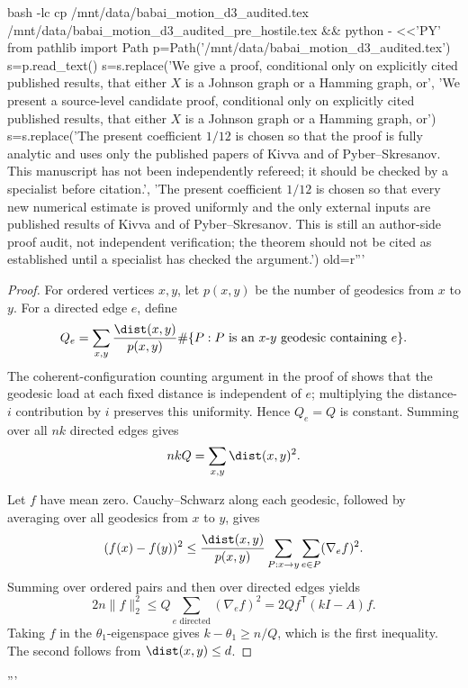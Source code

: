 bash -lc cp /mnt/data/babai_motion_d3_audited.tex /mnt/data/babai_motion_d3_audited_pre_hostile.tex && python - <<'PY'
from pathlib import Path
p=Path('/mnt/data/babai_motion_d3_audited.tex')
s=p.read_text()
s=s.replace('We give a proof, conditional only on explicitly cited published results, that either $X$ is a Johnson graph or a Hamming graph, or',
            'We present a source-level candidate proof, conditional only on explicitly cited published results, that either $X$ is a Johnson graph or a Hamming graph, or')
s=s.replace('The present coefficient $1/12$ is chosen so that the proof is fully analytic and uses only the published papers of Kivva and of Pyber--Skresanov.  This manuscript has not been independently refereed; it should be checked by a specialist before citation.',
            'The present coefficient $1/12$ is chosen so that every new numerical estimate is proved uniformly and the only external inputs are published results of Kivva and of Pyber--Skresanov.  This is still an author-side proof audit, not independent verification; the theorem should not be cited as established until a specialist has checked the argument.')
old=r'''\begin{proof}
For ordered vertices $x,y$, let $p(x,y)$ be the number of geodesics from $x$ to $y$.  For a directed edge $e$, define
\[
 Q_e=\sum_{x,y}\frac{\dist(x,y)}{p(x,y)}
 \#\{P:P\text{ is an }x\text{-}y\text{ geodesic containing }e\}.
\]
The coherent-configuration counting argument in the proof of \cite[Proposition 2.8]{PS} shows that the geodesic load at each fixed distance is independent of $e$; multiplying the distance-$i$ contribution by $i$ preserves this uniformity.  Hence $Q_e=Q$ is constant.  Summing over all $nk$ directed edges gives
\[
 nkQ=\sum_{x,y}\dist(x,y)^2.
\]

Let $f$ have mean zero.  Cauchy--Schwarz along each geodesic, followed by averaging over all geodesics from $x$ to $y$, gives
\[
 (f(x)-f(y))^2\le
 \frac{\dist(x,y)}{p(x,y)}
 \sum_{P:x\to y}\sum_{e\in P}(\nabla_e f)^2.
\]
Summing over ordered pairs and then over directed edges yields
\[
 2n\|f\|_2^2\le Q\sum_{e\text{ directed}}(\nabla_e f)^2
 =2Q f^{\mathsf T}(kI-A)f.
\]
Taking $f$ in the $\theta_1$-eigenspace gives $k-\theta_1\ge n/Q$, which is the first inequality.  The second follows from $\dist(x,y)\le d$.
\end{proof}'''
